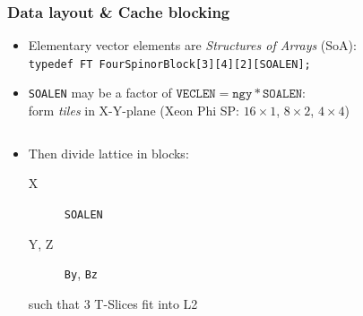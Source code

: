 \documentclass{beamer}
\begin{document}
  \begin{frame}
    \frametitle{Data layout \& Cache blocking}

    \begin{itemize}
      \item Elementary vector elements are \textit{Structures of Arrays} (SoA):\\
        \texttt{typedef FT FourSpinorBlock[3][4][2][SOALEN];}
        \vfill

      \item \texttt{SOALEN} may be a factor of $\texttt{VECLEN} = \texttt{ngy} * \texttt{SOALEN}$:\\
        form \textit{tiles} in X-Y-plane (Xeon Phi SP: $16\times1$, $8\times2$, $4\times4$)
    \end{itemize}

    \begin{columns}

      \begin{column}{.4\textwidth}
        \begin{center}
          \begin{itemize}
            \item Then divide lattice in blocks:
              \begin{description}
                \item[X]    \texttt{SOALEN}\\
                \item[Y, Z] \texttt{By}, \texttt{Bz}\\[2mm]
              \end{description}
              such that 3 T-Slices fit into L2
              \vfill
          \end{itemize}
        \end{center}
      \end{column}

      \begin{column}{.6\textwidth}
        \begin{center}
\end{center}
\end{column}
\end{columns}
\end{frame}
\end{document}
